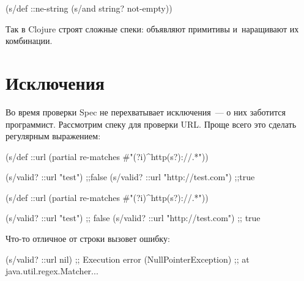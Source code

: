 \begin{english}
  \begin{clojure}
(s/def ::ne-string
  (s/and string? not-empty))
  \end{clojure}
\end{english}

Так в Clojure строят сложные спеки: объявляют примитивы и~наращивают их
комбинации.

\section{Исключения}


Во время проверки Spec не перехватывает исключения~--- о них заботится
программист. Рассмотрим спеку для проверки URL. Проще всего это сделать
регулярным выражением:


\ifx\DEVICETYPE\MOBILE

\begin{english}
  \begin{clojure}
(s/def ::url
  (partial
    re-matches #"(?i)^http(s?)://.*"))

(s/valid? ::url "test") ;;false
(s/valid? ::url "http://test.com") ;;true
  \end{clojure}
\end{english}

\else

\begin{english}
  \begin{clojure}
(s/def ::url
  (partial re-matches #"(?i)^http(s?)://.*"))

(s/valid? ::url "test")            ;; false
(s/valid? ::url "http://test.com") ;; true
  \end{clojure}
\end{english}

\fi

Что-то отличное от строки вызовет ошибку:


\begin{english}
  \begin{clojure}
(s/valid? ::url nil)
;; Execution error (NullPointerException)
;; at java.util.regex.Matcher...
  \end{clojure}
\end{english}

